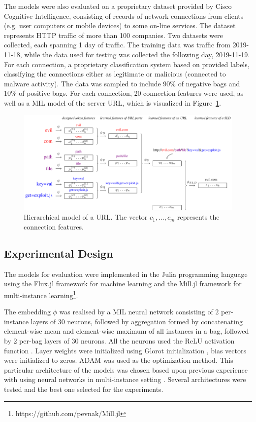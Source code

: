 The models were also evaluated on a proprietary dataset provided by Cisco Cognitive Intelligence, consisting of records of network connections from clients (e.g. user computers or mobile devices) to some on-line services. The dataset represents HTTP traffic of more than 100 companies. Two datasets were collected, each spanning 1 day of traffic. The training data was traffic from 2019-11-18, while the data used for testing was collected the following day, 2019-11-19. For each connection, a proprietary classification system based on \cite{jusko_graph-based_2017} provided labels, classifying the connections either as legitimate or malicious (connected to malware activity). The data was sampled to include 90\% of negative bags and 10\% of positive bags. For each connection, 20 connection features were used, as well as a MIL model of the server URL, which is visualized in Figure~\ref{fig:URL-model}.

\begin{figure}
  \centering
  \includegraphics[width=\textwidth]{images/URL-model/URL-model.pdf}
  \caption{Hierarchical model of a URL. The vector \( c_1, \dots, c_m \) represents the connection features.}\label{fig:URL-model}
\end{figure}

\subsection{Experimental Design}

The models for evaluation were implemented in the Julia programming language \cite{bezanson_julia:_2017} using the Flux.jl framework for machine learning \cite{innes_flux:_2018} and the Mill.jl framework for multi-instance learning\footnote{https://github.com/pevnak/Mill.jl}.

The embedding \( \phi \) was realised by a MIL neural network consisting of 2 per-instance layers of 30 neurons, followed by aggregation formed by concatenating element-wise mean and element-wise maximum of all instances in a bag, followed by 2 per-bag layers of 30 neurons. All the neurons used the ReLU activation function \cite{hahnloser_digital_2000}. Layer weights were initialized using Glorot initialization \cite{glorot_understanding_2010}, bias vectors were initialized to zeros. ADAM \cite{kingma_adam:_2017} was used as the optimization method. This particular architecture of the models was chosen based upon previous experience with using neural networks in multi-instance setting \cite{pevny_nested_2020}. Several architectures were tested and the best one selected for the experiments.

